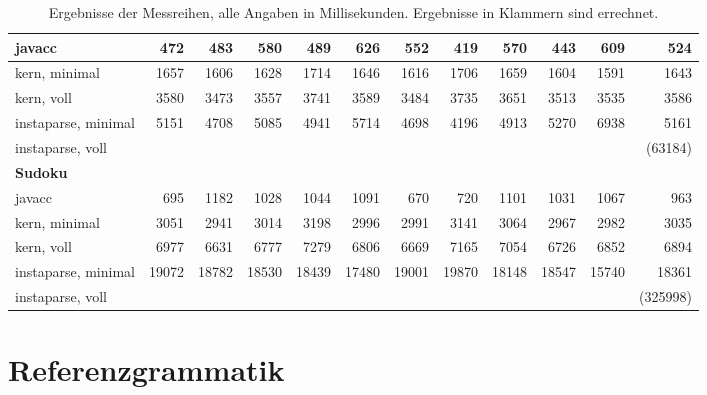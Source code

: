 \documentclass[ngerman,a4paper,abstracton,open=right,twoside=false,toc=listofnumbered,bibtotocnumbered]{scrreprt}
\begin{document}
\begin{table}[!h]
{{\begin{tabular}{|l|r|r|r|r|r|r|r|r|r|r|r|}
				javacc  & 472 & 483 & 580 & 489 & 626 & 552 & 419 & 570 & 443 & 609 & 524 \\ \hline
				kern, minimal   & 1657 & 1606 & 1628 & 1714 & 1646 & 1616 & 1706 & 1659 & 1604 & 1591 & 1643 \\ \hline
				kern, voll   & 3580 & 3473 & 3557 & 3741 & 3589 & 3484 & 3735 & 3651 & 3513 & 3535 & 3586 \\ \hline
				instaparse, minimal   & 5151 & 4708 & 5085 & 4941 & 5714 & 4698 & 4196 & 4913 & 5270 & 6938 & 5161 \\ \hline
				instaparse, voll   & \multicolumn{1}{l|}{} & \multicolumn{1}{l|}{} & \multicolumn{1}{l|}{} & \multicolumn{1}{l|}{} & \multicolumn{1}{l|}{} & \multicolumn{1}{l|}{} & \multicolumn{1}{l|}{} & \multicolumn{1}{l|}{} & \multicolumn{1}{l|}{} & \multicolumn{1}{l|}{} & (63184) \\ \hline
				\textbf{Sudoku} & \multicolumn{1}{l|}{} & \multicolumn{1}{l|}{} & \multicolumn{1}{l|}{} & \multicolumn{1}{l|}{} & \multicolumn{1}{l|}{} & \multicolumn{1}{l|}{} & \multicolumn{1}{l|}{} & \multicolumn{1}{l|}{} & \multicolumn{1}{l|}{} & \multicolumn{1}{l|}{} & \multicolumn{1}{l|}{} \\ \hline
				javacc  & 695 & 1182 & 1028 & 1044 & 1091 & 670 & 720 & 1101 & 1031 & 1067 & 963 \\ \hline
				kern, minimal   & 3051 & 2941 & 3014 & 3198 & 2996 & 2991 & 3141 & 3064 & 2967 & 2982 & 3035 \\ \hline
				kern, voll   & 6977 & 6631 & 6777 & 7279 & 6806 & 6669 & 7165 & 7054 & 6726 & 6852 & 6894 \\ \hline
				instaparse, minimal   & 19072 & 18782 & 18530 & 18439 & 17480 & 19001 & 19870 & 18148 & 18547 & 15740 & 18361 \\ \hline
				instaparse, voll   & \multicolumn{1}{l|}{} & \multicolumn{1}{l|}{} & \multicolumn{1}{l|}{} & \multicolumn{1}{l|}{} & \multicolumn{1}{l|}{} & \multicolumn{1}{l|}{} & \multicolumn{1}{l|}{} & \multicolumn{1}{l|}{} & \multicolumn{1}{l|}{} & \multicolumn{1}{l|}{} & (325998) \\ \hline
				\end{tabular}
			}
		}
		\label{Messergebnisse}
		\caption{Ergebnisse der Messreihen, alle Angaben in Millisekunden. Ergebnisse in Klammern sind errechnet.}
\end{table}

\newpage
\section{Referenzgrammatik}\label{refgrammatik}
\end{document}
